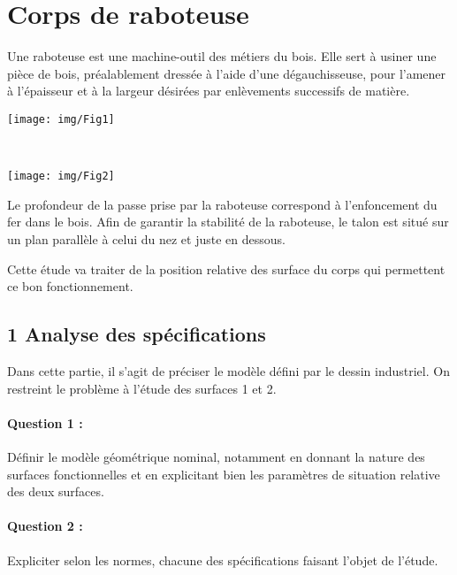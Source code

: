 

\section{Corps de raboteuse}
\begin{minipage}{0.6\linewidth}
Une raboteuse est une machine-outil des métiers du bois. Elle sert à usiner une pièce de bois, préalablement dressée à l'aide d'une dégauchisseuse, pour l'amener à l'épaisseur et à la largeur désirées par enlèvements successifs de matière.
\end{minipage}
 \hfill
\begin{minipage}{0.35\linewidth}
 \centering\texttt{[image: img/Fig1]}
\end{minipage}

~\

\begin{minipage}{0.35\linewidth}
 \centering\texttt{[image: img/Fig2]}
\end{minipage}
 \hfill
\begin{minipage}{0.6\linewidth}
Le profondeur de la passe prise par la raboteuse correspond à l'enfoncement du fer dans le bois. Afin de garantir la stabilité de la raboteuse, le talon est situé sur un plan parallèle à celui du nez et juste en dessous.

Cette étude va traiter de la position relative des surface du corps qui permettent ce bon fonctionnement.
\end{minipage}

\subsection{1 Analyse des spécifications}

Dans cette partie, il s'agit de préciser le modèle défini par le dessin industriel. On restreint le problème à l'étude des surfaces 1 et 2.

\paragraph{Question 1 :} Définir le modèle géométrique nominal, notamment en donnant la nature des surfaces
fonctionnelles et en explicitant bien les paramètres de situation relative des deux surfaces.

\paragraph{Question 2 :} Expliciter selon les normes, chacune des spécifications faisant l'objet de l'étude.

